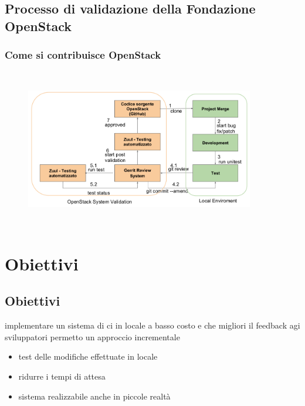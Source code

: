 \documentclass{beamer}
\theoremstyle{definition}
\theoremstyle{plain}
\begin{document}
\subsection{Processo di validazione della Fondazione OpenStack}
\begin{frame}
\frametitle{Come si contribuisce OpenStack}
\begin{figure}[!h]
	\begin{center}
\includegraphics[width=10cm, height=7cm]{sviluppo.png}
\end{center}
\end{figure}
\end{frame}

\section{Obiettivi}
\subsection{Obiettivi}
\begin{frame}
implementare un sistema di ci in locale a basso costo e che migliori il feedback agi sviluppatori permetto un approccio incrementale 
\begin{itemize}
\item
test delle modifiche effettuate in locale
\item
ridurre i tempi di attesa 
\item
sistema realizzabile anche in piccole realtà
\end{itemize}



\end{frame}
\end{document}
